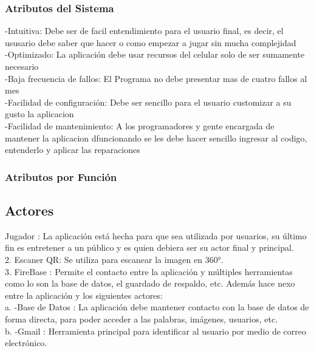 \subsubsection{Atributos del Sistema}
-Intuitiva: Debe ser de facil entendimiento para el usuario final, es decir, el ususario debe saber que hacer o como empezar a jugar sin mucha complejidad\\
-Optimizado: La aplicación debe usar recursos del celular solo de ser sumamente necesario\\
-Baja frecuencia de fallos: El Programa no debe presentar mas de cuatro fallos al mes\\
-Facilidad de configuración: Debe ser sencillo para el usuario customizar a su gusto la aplicacion\\
-Facilidad de mantenimiento: A los programadores y gente encargada de mantener la aplicacion dfuncionando se les debe hacer sencillo ingresar al codigo, entenderlo y aplicar las reparaciones\\
\subsubsection{Atributos por Función}

\newpage
\subsection{Actores}
Jugador : La aplicación está hecha para que sea utilizada por usuarios, su último fin es entretener a un público y es quien debiera ser su actor final y principal.\\
2. Escaner QR: Se utiliza para escanear la imagen en 360°.\\
3. FireBase : Permite el contacto entre la aplicación y múltiples herramientas como lo son la base de datos, el guardado de respaldo, etc. Además hace nexo entre la aplicación y los siguientes actores:\\
a. -Base de Datos : La aplicación debe mantener contacto con la base de datos de forma directa, para poder acceder a las palabras, imágenes, usuarios, etc.\\
b. -Gmail : Herramienta principal para identificar al usuario por medio de correo electrónico.
